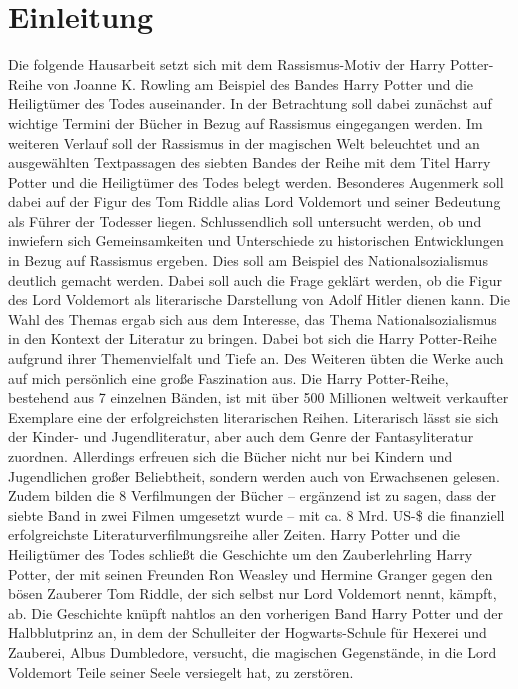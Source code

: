 \section{Einleitung} 
Die folgende Hausarbeit setzt sich mit dem Rassismus-Motiv der \glqq Harry Potter\grqq{}-Reihe von Joanne K. Rowling am Beispiel des Bandes \glqq Harry Potter und die Heiligtümer des Todes\grqq{} auseinander.
In der Betrachtung soll dabei zunächst auf wichtige Termini der Bücher in Bezug auf Rassismus eingegangen werden. 
Im weiteren Verlauf soll der Rassismus in der magischen Welt beleuchtet und an ausgewählten Textpassagen des siebten Bandes der Reihe mit dem Titel \glqq Harry Potter und die Heiligtümer des Todes\grqq{} belegt werden. 
Besonderes Augenmerk soll dabei auf der Figur des Tom Riddle alias Lord Voldemort und seiner Bedeutung als Führer der Todesser liegen.
Schlussendlich soll untersucht werden, ob und inwiefern sich Gemeinsamkeiten und Unterschiede zu historischen Entwicklungen in Bezug auf Rassismus ergeben. 
Dies soll am Beispiel des Nationalsozialismus deutlich gemacht werden. 
Dabei soll auch die Frage geklärt werden, ob die Figur des Lord Voldemort als  literarische Darstellung von Adolf Hitler dienen kann. 
Die Wahl des Themas ergab sich aus dem Interesse, das Thema \glqq Nationalsozialismus\grqq{} in den Kontext der Literatur zu bringen. 
Dabei bot sich die \glqq Harry Potter\grqq-Reihe aufgrund ihrer Themenvielfalt und Tiefe an. 
Des Weiteren übten die Werke auch auf mich persönlich eine große Faszination aus. 
Die \glqq Harry Potter\grqq-Reihe, bestehend aus 7 einzelnen Bänden, ist mit über 500 Millionen weltweit verkaufter Exemplare eine der erfolgreichsten literarischen Reihen. 
Literarisch lässt sie sich der Kinder- und Jugendliteratur, aber auch dem Genre der Fantasyliteratur zuordnen. 
Allerdings erfreuen sich die Bücher nicht nur bei Kindern und Jugendlichen großer Beliebtheit, sondern werden auch von Erwachsenen gelesen.
 Zudem bilden die 8 Verfilmungen der Bücher – ergänzend ist zu sagen, dass der siebte Band in zwei Filmen umgesetzt wurde – mit ca. 8 Mrd. US-\$ die finanziell erfolgreichste Literaturverfilmungsreihe aller Zeiten.
\glqq Harry Potter und die Heiligtümer des Todes\grqq{} schließt die Geschichte um den Zauberlehrling Harry Potter, der mit seinen Freunden Ron Weasley und Hermine Granger gegen den bösen Zauberer Tom Riddle, der sich selbst nur \glqq Lord Voldemort\grqq{} nennt, kämpft, ab.
Die Geschichte knüpft nahtlos an den vorherigen Band \glqq Harry Potter und der Halbblutprinz\grqq{} an, in dem der Schulleiter der Hogwarts-Schule für Hexerei und Zauberei, Albus Dumbledore, versucht, die magischen Gegenstände, in die Lord Voldemort Teile seiner Seele versiegelt hat, zu zerstören. 
